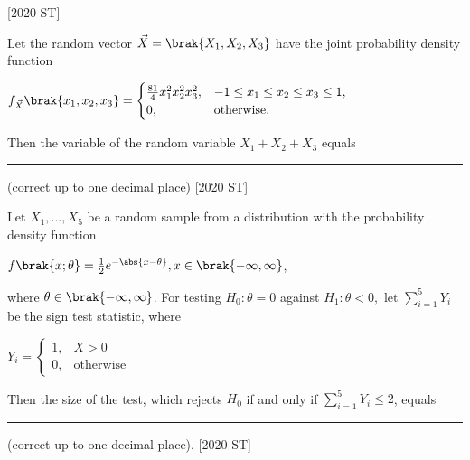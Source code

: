 \hfill [2020 ST]
\item Let the random vector $\vec{X} = \brak{X_1, X_2, X_3}$ have the joint probability density function 
\begin{center}
    $f_{\vec{X}}\brak{x_1,x_2,x_3} = 
    \begin{cases}
    \frac{81}{4} x_1^2 x_2^2 x_3^2, & -1 \leq x_1 \leq x_2 \leq x_3 \leq 1, \\
0, & \text{otherwise}.
    \end{cases}$ 
\end{center}
    
    Then the variable of the random variable $X_1 + X_2 + X_3$ equals \rule{2cm}{0.4pt}
    (correct up to one decimal place) \hfill[2020 ST]
    \item Let $X_1, \ldots ,X_5$ be a random sample from a distribution with the probability density function
    \begin{center}
        $f\brak{x;\theta} = \frac{1}{2}e^{- \abs{x - \theta}}, x \in \brak{-\infty, \infty}$,
    \end{center}   
    where $\theta \in \brak{-\infty, \infty}$. For testing $H_0 : \theta = 0$ against $H_1 : \theta < 0, \text{ let }  \sum_{i=1}^5 Y_i$  be the sign test statistic, where \\
    \begin{center}
        
     $Y_i = 
     \begin{cases}
         1, & X > 0  \\
         0, & \text{otherwise}
     \end{cases}$
    \end{center}
    Then the size of the test, which rejects $H_0$ if and only if $\sum_{i = 1}^5 Y_i \leq 2$, equals \rule{2cm}{0.4pt} (correct up to one decimal place). \hfill[2020 ST]
